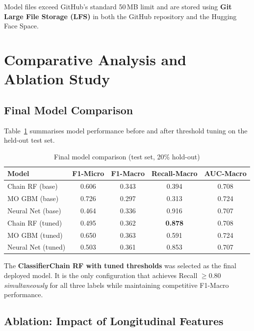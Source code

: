 \documentclass[12pt]{article}
\begin{document}
Model files exceed GitHub's standard 50\,MB limit and are stored using
\textbf{Git Large File Storage (LFS)} in both the GitHub repository and
the Hugging Face Space.


\section{Comparative Analysis and Ablation Study}

\subsection{Final Model Comparison}

Table~\ref{tab:final_compare} summarises model performance before and after
threshold tuning on the held-out test set.

\begin{table}[H]
\centering
\caption{Final model comparison (test set, 20\% hold-out)}
\label{tab:final_compare}
\begin{tabular}{lcccc}
\toprule
\textbf{Model} & \textbf{F1-Micro} & \textbf{F1-Macro} & \textbf{Recall-Macro} & \textbf{AUC-Macro} \\
\midrule
Chain RF (base)     & 0.606 & 0.343 & 0.394 & 0.708 \\
MO GBM (base)       & 0.726 & 0.297 & 0.313 & 0.724 \\
Neural Net (base)   & 0.464 & 0.336 & 0.916 & 0.707 \\
\midrule
Chain RF (tuned)    & 0.495 & 0.362 & \textbf{0.878} & 0.708 \\
MO GBM (tuned)      & 0.650 & 0.363 & 0.591 & 0.724 \\
Neural Net (tuned)  & 0.503 & 0.361 & 0.853 & 0.707 \\
\bottomrule
\end{tabular}
\end{table}

The \textbf{ClassifierChain RF with tuned thresholds} was selected as the final
deployed model. It is the only configuration that achieves Recall $\geq 0.80$
\emph{simultaneously} for all three labels while maintaining competitive
F1-Macro performance.

\subsection{Ablation: Impact of Longitudinal Features}
\end{document}
